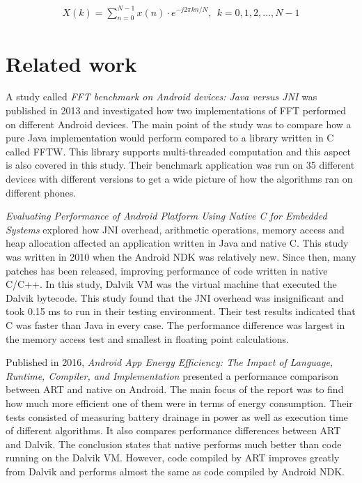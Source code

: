 \begin{align}
    X\left(k\right) = \sum\limits_{n=0}^{N-1}x\left(n\right)\cdot e^{-j2\pi kn/N},\ \ k = 0,1,2,\dots,N-1\label{eq:1}
\end{align}

\section{Related work}
A study called \emph{FFT benchmark on Android devices: Java versus JNI} \cite{Jr2013} was published in 2013 and investigated how two implementations of FFT performed on different Android devices. The main point of the study was to compare how a pure Java implementation would perform compared to a library written in C called FFTW. This library supports multi-threaded computation and this aspect is also covered in this study. Their benchmark application was run on 35 different devices with different versions to get a wide picture of how the algorithms ran on different phones.

\emph{Evaluating Performance of Android Platform Using Native C for Embedded Systems} \cite{Lee2010} explored how JNI overhead, arithmetic operations, memory access and heap allocation affected an application written in Java and native C. This study was written in 2010 when the Android NDK was relatively new. Since then, many patches has been released, improving performance of code written in native C/C++. In this study, Dalvik VM was the virtual machine that executed the Dalvik bytecode. This study found that the JNI overhead was insignificant and took 0.15 ms to run in their testing environment. Their test results indicated that C was faster than Java in every case. The performance difference was largest in the memory access test and smallest in floating point calculations.

Published in 2016, \emph{Android App Energy Efficiency: The Impact of Language, Runtime, Compiler, and Implementation} \cite{Chen2016} presented a performance comparison between ART and native on Android. The main focus of the report was to find how much more efficient one of them were in terms of energy consumption. Their tests consisted of measuring battery drainage in power as well as execution time of different algorithms. It also compares performance differences between ART and Dalvik. The conclusion states that native performs much better than code running on the Dalvik VM. However, code compiled by ART improves greatly from Dalvik and performs almost the same as code compiled by Android NDK.
